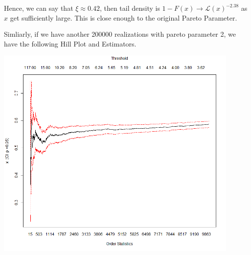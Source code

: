 \documentclass[letterpaper,12pt,titlepage,oneside,final]{book}
\begin{document}
Hence, we can say that $\xi \approx 0.42$, then tail density is  $1 - F(x) \to \mathcal{L}(x) ^{-2.38}$ as $x$ get sufficiently large. This is close enough to the original Pareto Parameter.

Simliarly, if we have another 200000 realizations with pareto parameter 2, we have the following Hill Plot and Estimators.

\noindent\begin{minipage}{\textwidth}
	\begin{minipage}{0.45\textwidth}
		\centering
		\includegraphics[width=0.9\textwidth]{ParHill2}
	\end{minipage}
	\hfill
	\begin{minipage}[b]{0.45\textwidth}
		\centering
		\label{tab: Pareto Hill2} 
		\scriptsize
	\end{minipage}
\end{minipage}
\end{document}
